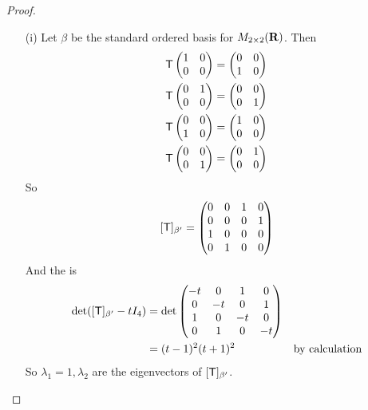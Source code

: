 \begin{proof}
\begin{enumerate}
\item[(i)]
Let \(\beta\) be the standard ordered basis for \(M_{2 \times 2}(\mathbf{R})\).
Then
\begin{align*}
    \textsf{T} \begin{pmatrix} 1 & 0 \\ 0 & 0 \end{pmatrix} & = \begin{pmatrix} 0 & 0 \\ 1 & 0 \end{pmatrix} \\
    \textsf{T} \begin{pmatrix} 0 & 1 \\ 0 & 0 \end{pmatrix} & = \begin{pmatrix} 0 & 0 \\ 0 & 1 \end{pmatrix} \\
    \textsf{T} \begin{pmatrix} 0 & 0 \\ 1 & 0 \end{pmatrix} & = \begin{pmatrix} 1 & 0 \\ 0 & 0 \end{pmatrix} \\
    \textsf{T} \begin{pmatrix} 0 & 0 \\ 0 & 1 \end{pmatrix} & = \begin{pmatrix} 0 & 1 \\ 0 & 0 \end{pmatrix}
\end{align*}
So
\[
    [\textsf{T}]_{\beta'} = \begin{pmatrix}
        0 & 0 & 1 & 0 \\
        0 & 0 & 0 & 1 \\
        1 & 0 & 0 & 0 \\
        0 & 1 & 0 & 0
    \end{pmatrix}
\]
And the \CPOLY{} is
\begin{align*}
    \det([\textsf{T}]_{\beta'} - t I_4)
    & = \det \begin{pmatrix}
        -t & 0 & 1 & 0 \\
        0 & -t & 0 & 1 \\
        1 & 0 & -t & 0 \\
        0 & 1 & 0 & -t
    \end{pmatrix} \\
    & = (t - 1)^2(t + 1)^2 & \text{by calculation}
\end{align*}
So \(\lambda_1 = 1, \lambda_2\) are the eigenvectors of \([\textsf{T}]_{\beta'}\).


\end{enumerate}
\end{proof}
